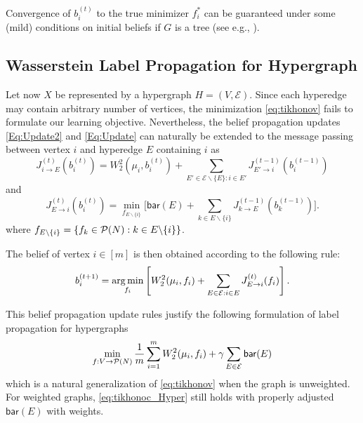 \documentclass[letterpaper]{article} %
\begin{document}
Convergence of $b_i^{(t)}$ to the true minimizer $f^*_i$ can be guaranteed under some (mild) conditions on initial beliefs if $G$ is a tree (see e.g., \cite{min_Sum}). 
\subsection{Wasserstein Label Propagation for Hypergraph}
Let now $X$ be represented by a hypergraph $H=(V, \mathcal E)$. Since each hyperedge may contain arbitrary number of vertices, the minimization \eqref{eq:tikhonov} fails to formulate our learning objective. Nevertheless, the belief propagation updates \eqref{Eq:Update2} and \eqref{Eq:Update} can naturally be extended to the message passing between vertex $i$ and hyperedge $E$ containing $i$ as 
\begin{equation}\label{Eq:Update_H_2}
J^{(t)}_{i\to E} (b_i^{(t)}) = W_2^2(\mu_i, b_i^{(t)}) + \sum_{E'\in \mathcal E\backslash\{E\}: i\in E'}J^{(t-1)}_{E'\to i}(b_i^{(t-1)})
\end{equation}
and 
\begin{equation}\label{Eq:Update_H}
    J^{(t)}_{E\to i}(b_i^{(t)}) =  \min_{f_{E\backslash \{i\}}}\Big[\mathsf{bar}(E) + \sum_{k\in E\backslash \{i\}}J^{(t-1)}_{k\to E}(b_k^{(t-1)})\Big].
\end{equation}
where  $f_{E\backslash \{i\}}=\{f_k\in\P(N): k\in E\backslash\{i\}\}$.

The belief of vertex $i\in [m]$ is then obtained according to the following rule:
$$b_i^{(t+1)}=\argmin_{f_i}\left[W_2^2(\mu_i, f_i) + \sum_{E\in \mathcal{E}:i\in E}J^{(t)}_{E\to i}(f_i)\right].$$


This belief propagation update rules justify the following formulation of label propagation for hypergraphs
\begin{equation}\label{eq:tikhonoc_Hyper}
    \min_{f:V\to \P(N)} \frac{1}{m}\sum_{i=1}^m W_2^2(\mu_i, f_i) + \gamma\sum_{E\in \mathcal E}\mathsf{bar}(E)
\end{equation}
which is a natural generalization of \eqref{eq:tikhonov} when the graph is unweighted. For weighted graphs, \eqref{eq:tikhonoc_Hyper} still holds with properly adjusted $\mathsf{bar}(E)$ with weights.
\end{document}

